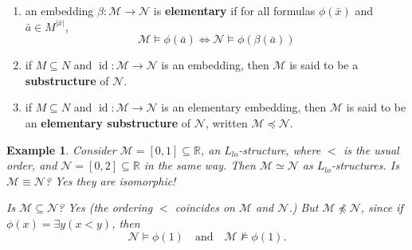 \documentclass{article}
\let\models\vDash
\let\nModels\nvDash
\DeclareMathOperator{\Th}{Th}
\newtheorem{nexample}[nthm]{Example}
\begin{document}
\begin{ndef}\label{def:3.4}\leavevmode
  \begin{enumerate}[label=(\roman*)]
    \item an embedding $\beta: \mathcal{M} \to \mathcal{N}$ is \textbf{elementary} if for all formulas $\phi(\bar{x})$ and $\bar{a} \in M^{|\bar{x}|}$,
      \begin{equation*}
        \mathcal{M} \models \phi(\bar{a}) \iff \mathcal{N} \models \phi(\beta(\bar{a}))
      \end{equation*}
    \item if $M \subseteq N$ and $\operatorname{id}: \mathcal{M} \to \mathcal{N}$ is an embedding, then $\mathcal{M}$ is said to be a \textbf{substructure} of $\mathcal{N}$.
    \item if $M \subseteq N$ and $\operatorname{id}: \mathcal{M} \to \mathcal{N}$ is an elementary embedding, then $\mathcal{M}$ is said to be an \textbf{elementary substructure} of $\mathcal{N}$, written $\mathcal{M} \preccurlyeq \mathcal{N}$.
  \end{enumerate}
\end{ndef}
\begin{nexample}\label{eg:3.5}
  Consider $\mathcal{M} = [0,1] \subseteq \mathbb{R}$, an $L_{lo}$-structure, where $<$ is the usual order, and $\mathcal{N} = [0,2] \subseteq \mathbb{R}$ in the same way.
  Then $\mathcal{M} \simeq \mathcal{N}$ as $L_{lo}$-structures.
  Is $\mathcal{M} \equiv \mathcal{N}$? Yes they are isomorphic!

  Is $\mathcal{M} \subseteq \mathcal{N}$? Yes (the ordering $<$ coincides on $\mathcal{M}$ and $\mathcal{N}$.)
  But $\mathcal{M} \not\preccurlyeq \mathcal{N}$, since if $\phi(x) = \exists y (x < y)$, then
  \begin{equation*}
    \mathcal{N} \models \phi(1)\quad\text{and}\quad\mathcal{M} \nModels \phi(1).
  \end{equation*}
\end{nexample}
\end{document}
